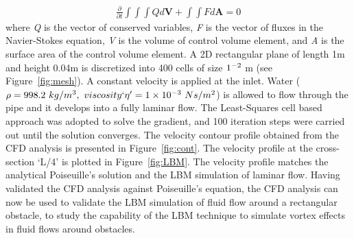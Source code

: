 \begin{align}
\frac{\partial}{\partial t} \int\int\int  Q d\mathbf{V} + \int\int \textit{F} d\mathbf{A} = 0
\end{align}
where \textit{Q} is the vector of conserved variables, \textit{F} is the vector of fluxes in the Navier-Stokes equation, \textit{V} is the volume of control volume element, and \textit{A} is the surface area of the control volume element. A 2D rectangular plane of length 1m and height 0.04m is discretized into 400 cells of size $1 \time 10^{-2} $ m (see Figure~\ref{fig:mesh}). A constant velocity is applied at the inlet. Water ($\rho = 998.2\mbox{ }kg/m^{3},\mbox{ } viscosity`\eta'=1 \times 10^{-3}\mbox{ } Ns/m^{2} $) is allowed to flow through the pipe and it develops into a fully laminar flow. The Least-Squares cell based approach was adopted to solve the gradient, and 100 iteration steps were carried out until the solution converges. The velocity contour profile obtained from the CFD analysis is presented in Figure~\ref{fig:cont}. The velocity profile at the cross-section `L/4' is plotted in Figure~\ref{fig:LBM}. The velocity profile matches the analytical Poiseuille's solution and the LBM simulation of laminar flow. Having validated the CFD analysis against Poiseuille's equation, the CFD analysis can now be used to validate the LBM simulation of fluid flow around a rectangular obstacle, to study the capability of the LBM technique to simulate vortex effects in fluid flows around obstacles.

